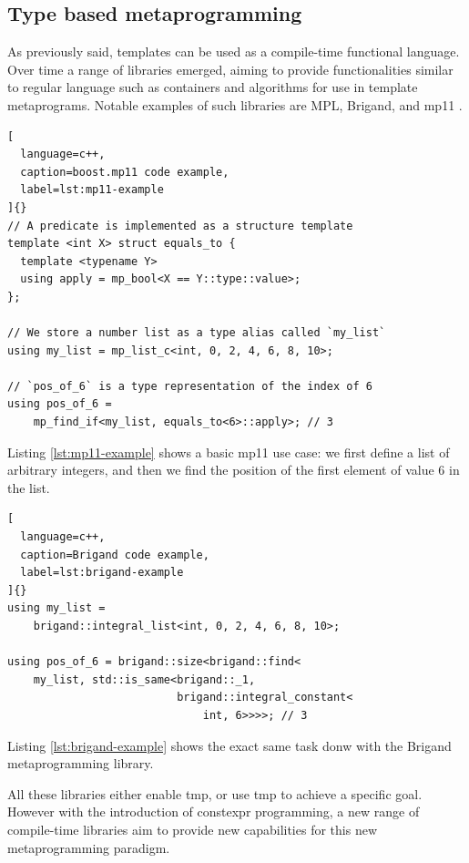 \documentclass[../main]{subfiles}
\begin{document}
\subsection{
  Type based metaprogramming
}

As previously said, \cpp templates can be used as a compile-time
functional language. Over time a range of libraries emerged, aiming to provide
functionalities similar to regular language such as containers and algorithms
for use in template metaprograms. Notable examples of such libraries are
MPL\cite{mpl}, Brigand\cite{brigand}, and mp11 \cite{mp11}.

\begin{lstlisting}[
  language=c++,
  caption=boost.mp11 code example,
  label=lst:mp11-example
]{}
// A predicate is implemented as a structure template
template <int X> struct equals_to {
  template <typename Y>
  using apply = mp_bool<X == Y::type::value>;
};

// We store a number list as a type alias called `my_list`
using my_list = mp_list_c<int, 0, 2, 4, 6, 8, 10>;

// `pos_of_6` is a type representation of the index of 6
using pos_of_6 =
    mp_find_if<my_list, equals_to<6>::apply>; // 3
\end{lstlisting}

Listing \ref{lst:mp11-example} shows a basic mp11 use case: we first define a
list of arbitrary integers, and then we find the position of the first element
of value 6 in the list.

\clearpage%

\begin{lstlisting}[
  language=c++,
  caption=Brigand code example,
  label=lst:brigand-example
]{}
using my_list =
    brigand::integral_list<int, 0, 2, 4, 6, 8, 10>;

using pos_of_6 = brigand::size<brigand::find<
    my_list, std::is_same<brigand::_1,
                          brigand::integral_constant<
                              int, 6>>>>; // 3
\end{lstlisting}

Listing \ref{lst:brigand-example} shows the exact same task donw with the
Brigand metaprogramming library.

All these libraries either enable \gls{tmp}, or use \gls{tmp} to achieve
a specific goal. However with the introduction of \gls{constexpr} programming,
a new range of compile-time libraries aim to provide new capabilities
for this new metaprogramming paradigm.
\end{document}
